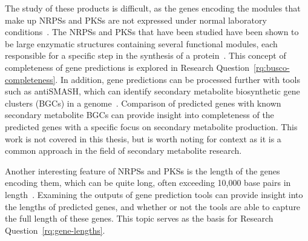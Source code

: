  The study of these products is difficult, as the genes encoding the modules that make up NRPSs and PKSs are not expressed under normal laboratory conditions~\cite{Mukherjee2012}. The NRPSs and PKSs that have been studied
 have been shown to be large enzymatic structures containing several 
 functional modules, each responsible for a specific step in the synthesis 
 of a protein~\cite{Mukherjee2012}. This concept of completeness of gene predictions is explored in Research Question~\ref{rq:busco-completeness}. 
 In addition, gene predictions can be processed further with tools such as antiSMASH, which can identify secondary metabolite biosynthetic gene clusters (BGCs) in a genome~\cite{blin2023}. Comparison of predicted genes with known secondary metabolite BGCs can provide insight into completeness of the predicted genes with a specific focus on secondary metabolite production. This work is not covered in this thesis, but is worth noting for context as it is a common approach in the field of secondary metabolite research.

 Another interesting feature of NRPSs and PKSs is the length of the genes encoding them, which can be quite long, often exceeding 10,000 base pairs in length~\cite{komaki2020}. Examining the outputs of gene prediction tools can provide insight into the lengths of predicted genes, and whether or not the tools are able to capture the full length of these genes. This topic serves as the basis for Research Question~\ref{rq:gene-lengths}.  


